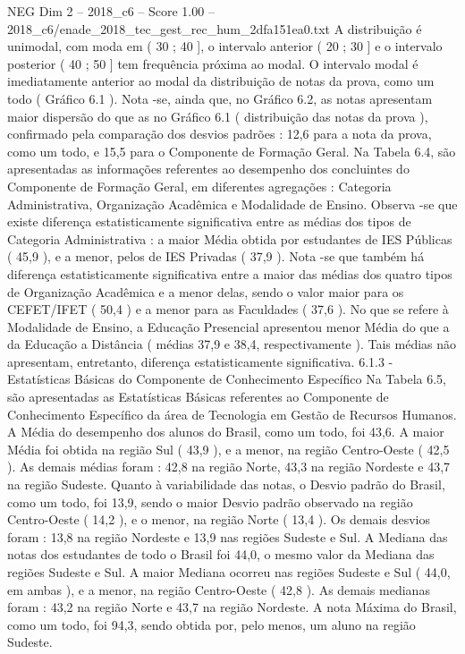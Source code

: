 \begin{textsample}{NEG Dim 2 – 2018\_c6 – Score 1.00 – 2018\_c6/enade\_2018\_tec\_gest\_rec\_hum\_2dfa151ea0.txt}
A distribuição é unimodal, com moda em ( 30 ; 40 ], o intervalo anterior ( 20 ; 30 ] e o intervalo posterior ( 40 ; 50 ] tem frequência próxima ao modal.
O intervalo modal é imediatamente anterior ao modal da distribuição de notas da prova, como um todo ( Gráfico 6.1 ).
Nota -se, ainda que, no Gráfico 6.2, as notas apresentam maior dispersão do que as no Gráfico 6.1 ( distribuição das notas da prova ), confirmado pela comparação dos desvios padrões : 12,6 para a nota da prova, como um todo, e 15,5 para o Componente de Formação Geral.
Na Tabela 6.4, são apresentadas as informações referentes ao desempenho dos concluintes do Componente de Formação Geral, em diferentes agregações : Categoria Administrativa, Organização Acadêmica e Modalidade de Ensino.
Observa -se que existe diferença estatisticamente significativa entre as médias dos tipos de Categoria Administrativa : a maior Média obtida por estudantes de IES Públicas ( 45,9 ), e a menor, pelos de IES Privadas ( 37,9 ).
Nota -se que também há diferença estatisticamente significativa entre a maior das médias dos quatro tipos de Organização Acadêmica e a menor delas, sendo o valor maior para os CEFET/IFET ( 50,4 ) e a menor para as Faculdades ( 37,6 ).
No que se refere à Modalidade de Ensino, a Educação Presencial apresentou menor Média do que a da Educação a Distância ( médias 37,9 e 38,4, respectivamente ).
Tais médias não apresentam, entretanto, diferença estatisticamente significativa. 6.1.3 - Estatísticas Básicas do Componente de Conhecimento Específico Na Tabela 6.5, são apresentadas as Estatísticas Básicas referentes ao Componente de Conhecimento Específico da área de Tecnologia em Gestão de Recursos Humanos.
A Média do desempenho dos alunos do Brasil, como um todo, foi 43,6.
A maior Média foi obtida na região Sul ( 43,9 ), e a menor, na região Centro-Oeste ( 42,5 ).
As demais médias foram : 42,8 na região Norte, 43,3 na região Nordeste e 43,7 na região Sudeste.
Quanto à variabilidade das notas, o Desvio padrão do Brasil, como um todo, foi 13,9, sendo o maior Desvio padrão observado na região Centro-Oeste ( 14,2 ), e o menor, na região Norte ( 13,4 ).
Os demais desvios foram : 13,8 na região Nordeste e 13,9 nas regiões Sudeste e Sul.
A Mediana das notas dos estudantes de todo o Brasil foi 44,0, o mesmo valor da Mediana das regiões Sudeste e Sul.
A maior Mediana ocorreu nas regiões Sudeste e Sul ( 44,0, em ambas ), e a menor, na região Centro-Oeste ( 42,8 ).
As demais medianas foram : 43,2 na região Norte e 43,7 na região Nordeste.
A nota Máxima do Brasil, como um todo, foi 94,3, sendo obtida por, pelo menos, um aluno na região Sudeste.

\end{textsample}
